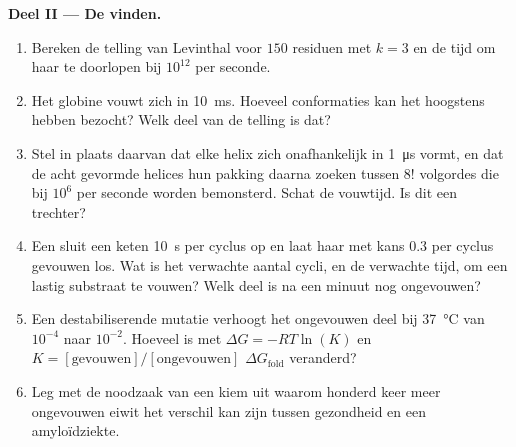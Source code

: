 \begin{problem}
\medskip
\noindent\textbf{Deel II --- De  vinden.}
\begin{enumerate}[resume]
  \item Bereken de telling van Levinthal voor $150$ residuen met
        $k = 3$ en de tijd om haar te doorlopen bij $10^{12}$ per
        seconde.
  \item Het globine vouwt zich in \qty{10}{ms}. Hoeveel conformaties
        kan het hoogstens hebben bezocht? Welk deel van de telling is
        dat?
  \item Stel in plaats daarvan dat elke helix zich onafhankelijk in
        \qty{1}{\micro s} vormt, en dat de acht gevormde helices hun
        pakking daarna zoeken tussen $8!$ volgordes die bij $10^{6}$
        per seconde worden bemonsterd. Schat de vouwtijd. Is dit een
        trechter?
  \item Een  sluit een keten \qty{10}{s} per cyclus op en
        laat haar met kans $0.3$ per cyclus gevouwen los. Wat is het
        verwachte aantal cycli, en de verwachte tijd, om een lastig
        substraat te vouwen? Welk deel is na een minuut nog ongevouwen?
  \item Een destabiliserende mutatie verhoogt het ongevouwen deel bij
        \qty{37}{\celsius} van $10^{-4}$ naar $10^{-2}$. Hoeveel is met
        $\Delta G =
        -RT\ln(K)$ en $K = [\text{gevouwen}]/[\text{ongevouwen}]$
        $\Delta G_{\text{fold}}$ veranderd?
  \item Leg met de noodzaak van een kiem uit waarom honderd keer meer
        ongevouwen eiwit het verschil kan zijn tussen gezondheid en een
        amyloïdziekte.
\end{enumerate}


\end{problem}
